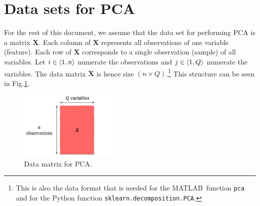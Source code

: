 \documentclass[10pt,twocolumn]{article}
\begin{document}
%
%
%
%
%
%
%

\section{Data sets for PCA}

For the rest of this document, we assume that the data set for performing PCA is a matrix $\bm{X}$. Each column of $\bm{X}$ represents all observations of one variable (feature). Each row of $\bm{X}$ corresponds to a single observation (sample) of all variables. Let $i \in \braket{1, n}$ numerate the observations and $j \in \braket{1, Q}$ numerate the variables. The data matrix $\bm{X}$ is hence size $(n \times Q)$.\footnote{This is also the data format that is needed for the MATLAB\textregistered \, function \texttt{pca} and for the Python function \texttt{sklearn.decomposition.PCA}.} This structure can be seen in Fig.\ref{fig:data-matrix}.


\begin{figure}[H]
\centering\includegraphics[width=5cm]{data-set-PCA.png}
\caption{Data matrix for PCA.}
\label{fig:data-matrix}
\end{figure}
\end{document}
